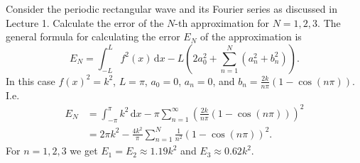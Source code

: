Consider the periodic rectangular wave and its Fourier series as discussed in Lecture 1. Calculate the error of the $N$-th approximation for $N = 1,2,3$.
\bigbreak
The general formula for calculating the error $E_N$ of the approximation is
\[ 
E_N = \int_{-L}^{L} f^2(x) \, \mathrm{d}x - L \left( 2a_0^2 + \sum_{n = 1}^{N} \left( a_n^2 + b_n^2 \right) \right)
.\]
In this case $f(x)^2 = k^2$, $L = \pi$, $a_0 = 0$, $a_n = 0$, and $b_n = \frac{2k}{n\pi} \left( 1 - \cos(n\pi) \right)$. I.e.
\begin{align*}
  E_N &= \int_{-\pi}^{\pi} k^2 \, \mathrm{d}x - \pi \sum_{n = 1}^{\infty} \left( \frac{2k}{n\pi} \left( 1 - \cos \left( n\pi \right) \right)\right)^2 \\
      &= 2\pi k^2 - \frac{4k^2}{\pi} \sum_{n = 1}^{N} \frac{1}{n^2} \left( 1 - \cos(n \pi) \right)^2
.\end{align*}
For $n = 1,2,3$ we get $E_1 = E_2 \approx \num{1,19} k^2$ and $E_3 \approx \num{0,62} k^2$.

